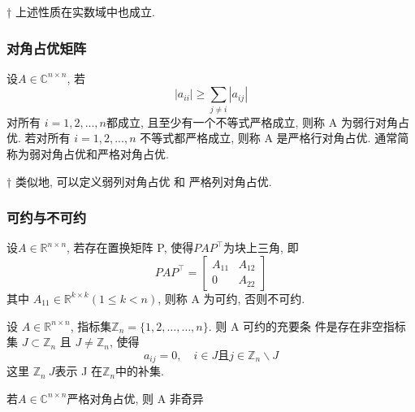 \documentclass[12pt,a4paper]{article}
\begin{document}
\begin{framed}
	† 上述性质在实数域中也成立.
\end{framed}


\subsubsection{对角占优矩阵}

\begin{framed}
	\begin{definition}
	设$ A ∈\mathbb{C}^{n×n}$, 若
	$$
	\left|a_{i i}\right| \geq \sum_{j \neq i}\left|a_{i j}\right|
	$$
	对所有 $i = 1, 2, . . . , n $都成立, 且至少有一个不等式严格成立, 则称 A
	为弱行对角占优. 若对所有 $i = 1, 2, . . . , n$ 不等式都严格成立, 则称 A
	是严格行对角占优. 通常简称为弱对角占优和严格对角占优.	
	\end{definition}
\end{framed}

\begin{framed}
	† 类似地, 可以定义弱列对角占优 和 严格列对角占优.
\end{framed}

\subsubsection{可约与不可约}
设$A \in \mathbb{R}^{n \times n}$, 若存在置换矩阵 P, 使得$P A P^{\top}$为块上三角, 即
$$
P A P^{\top}=\left[\begin{array}{cc}{A_{11}} & {A_{12}} \\ {0} & {A_{22}}\end{array}\right]
$$
其中 $A_{11} \in \mathbb{R}^{k \times k}(1 \leq k<n)$, 则称 A 为可约, 否则不可约.


\begin{framed}
	\begin{theorem}
		设 $A \in \mathbb{R}^{n \times n}$, 指标集$\mathbb{Z}_{n}=\{1,2, \ldots, \ldots, n\}$. 则 A 可约的充要条
		件是存在非空指标集 $J \subset \mathbb{Z}_{n}$ 且 $J \neq \mathbb{Z}_{n}$, 使得
		$$
		a_{i j}=0, \quad i \in J \text{且} j \in \mathbb{Z}_{n} \backslash J
		$$
		这里 $\mathbb{Z}_n \ J $表示 J 在$ \mathbb{Z}_n $中的补集.	
	\end{theorem}
\end{framed}

\begin{framed}
	\begin{theorem}
		若$A \in \mathbb{C}^{n \times n}$严格对角占优, 则 A 非奇异	
	\end{theorem}
\end{framed}
\end{document}
